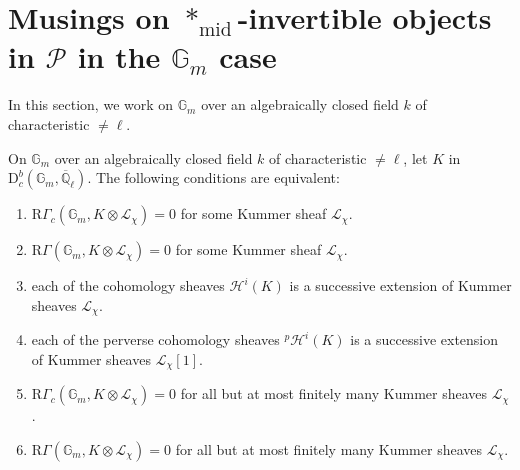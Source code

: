 \section[Musings on middle-invertible objects]{Musings on
\texorpdfstring{\(*_{\mathrm{mid}}\)}{*mid}-invertible objects in
\texorpdfstring{\(\mathcal{P}\)}{P} in the
\texorpdfstring{\(\mathbb{G}_m\)}{Gm} case}\label{sec:2.12}

In this section, we work on \(\mathbb{G}_m\) over an algebraically closed field
\(k\) of characteristic \(\ne\ell\).

On \(\mathbb{G}_m\) over an algebraically closed field \(k\) of characteristic
\(\ne\ell\), let \(K\) in
\(\mathrm{D}^b_c(\mathbb{G}_m,\overline{\mathbb{Q}}_\ell)\). The following
conditions are equivalent:
\begin{enumerate}[label=(\arabic*)]
\item \(\mathrm{R}\Gamma_c(\mathbb{G}_m,K\otimes\mathcal{L}_\chi)=0\) for
some Kummer sheaf \(\mathcal{L}_\chi\).
\item \(\mathrm{R}\Gamma(\mathbb{G}_m,K\otimes\mathcal{L}_\chi)=0\) for some
Kummer sheaf \(\mathcal{L}_\chi\).
\item[(3a)] each of the cohomology sheaves \(\mathcal{H}^i(K)\) is a
successive extension of Kummer sheaves \(\mathcal{L}_\chi\).
\item[(3b)] each of the perverse cohomology sheaves
\({}^p\mathcal{H}^i(K)\) is a successive extension of Kummer sheaves
\(\mathcal{L}_\chi[1]\).
\item \(\mathrm{R}\Gamma_c(\mathbb{G}_m,K\otimes\mathcal{L}_\chi)=0\) for all
but at most finitely many Kummer sheaves \(\mathcal{L}_\chi\).
\item \(\mathrm{R}\Gamma(\mathbb{G}_m,K\otimes\mathcal{L}_\chi)=0\) for all
but at most finitely many Kummer sheaves \(\mathcal{L}_\chi\).
\end{enumerate}
